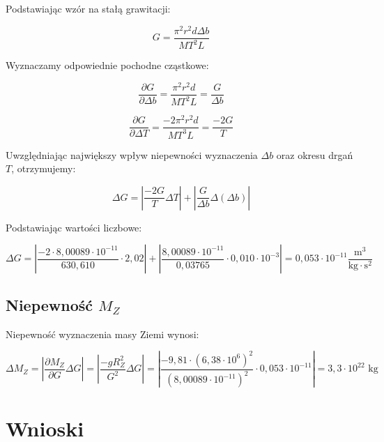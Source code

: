 \documentclass[a4paper,12pt]{article}
\begin{document}
Podstawiając wzór na stałą grawitacji:

\begin{equation*}
    \label{eq:g}
    G = \frac{\pi^2 r^2 d \Delta b}{MT^2L}
\end{equation*}

Wyznaczamy odpowiednie pochodne cząstkowe:

\begin{equation*}
    \frac{\partial G}{\partial \Delta b} = \frac{\pi^2 r^2 d}{MT^2L} = \frac{G}{\Delta b}
\end{equation*}

\begin{equation*}
    \frac{\partial G}{\partial \Delta T} = \frac{-2\pi^2 r^2 d}{MT^3L} = \frac{-2G}{T}
\end{equation*}

Uwzględniając największy wpływ niepewności wyznaczenia $\Delta b$ oraz okresu drgań $T$, otrzymujemy:

\begin{equation*}
    \Delta G = | \frac{-2G}{T} \Delta T | + | \frac{G}{\Delta b} \Delta( \Delta b ) |
\end{equation*}

Podstawiając wartości liczbowe:

\begin{equation*}
    \Delta G = | \frac{-2 \cdot 8{,}00089 \cdot 10^{-11}}{630{,}610} \cdot 2{,}02 | + | \frac{8{,}00089 \cdot 10^{-11}}{0{,}03765} \cdot 0{,}010 \cdot 10^{-3} |
    = 0{,}053 \cdot 10^{-11} \frac{\text{m}^3}{\text{kg} \cdot \text{s}^2}
\end{equation*}

\subsection{Niepewność $M_Z$}

Niepewność wyznaczenia masy Ziemi wynosi:

$$
    \Delta M_Z = | \frac{\partial M_Z}{\partial G} \Delta G | = | \frac{-gR_Z^2}{G^{2}} \Delta G | = | \frac{-9{,}81 \cdot (6{,}38 \cdot 10^6)^2}{(8{,}00089 \cdot 10^{-11})^2} \cdot 0{,}053 \cdot 10^{-11} | = 3{,}3 \cdot 10^{22} \text{ kg}
$$


\section{Wnioski}
\end{document}
